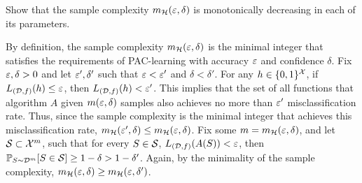 \begin{problem}{1}
    Show that the sample complexity $m_{\mathcal{H}}(\varepsilon, \delta)$ is monotonically decreasing in each of its parameters.
\end{problem}
\begin{solution}
    By definition, the sample complexity $m_{\mathcal{H}}(\varepsilon, \delta)$ is the minimal integer that satisfies the requirements of PAC-learning with accuracy $\varepsilon$ and confidence $\delta$. Fix $\varepsilon, \delta > 0$ and let $\varepsilon', \delta'$ such that $\varepsilon < \varepsilon'$ and $\delta < \delta'$. For any $h \in \{0,1\}^{\mathcal{X}}$, if $L_{(\mathcal{D}, f)}(h) \leq \varepsilon$, then $L_{(\mathcal{D}, f)}(h) < \varepsilon'$. This implies that the set of all functions that algorithm $A$ given $m(\varepsilon,\delta)$ samples also achieves no more than $\varepsilon'$ misclassification rate. Thus, since the sample complexity is the minimal integer that achieves this misclassification rate, $m_{\mathcal{H}}(\varepsilon', \delta) \leq m_{\mathcal{H}}(\varepsilon, \delta)$. Fix some $m = m_{\mathcal{H}}(\varepsilon, \delta)$, and let $\mathcal{S} \subset \mathcal{X}^m$, such that for every $S \in \mathcal{S}$, $L_{(\mathcal{D}, f)}(A(S)) < \varepsilon$, then $\mathbb{P}_{S \sim \mathcal{D}^m}[S \in \mathcal{S}] \geq 1 - \delta > 1 - \delta'$. Again, by the minimality of the sample complexity, $m_{\mathcal{H}}(\varepsilon, \delta) \geq m_{\mathcal{H}}(\varepsilon, \delta')$.
\end{solution}

